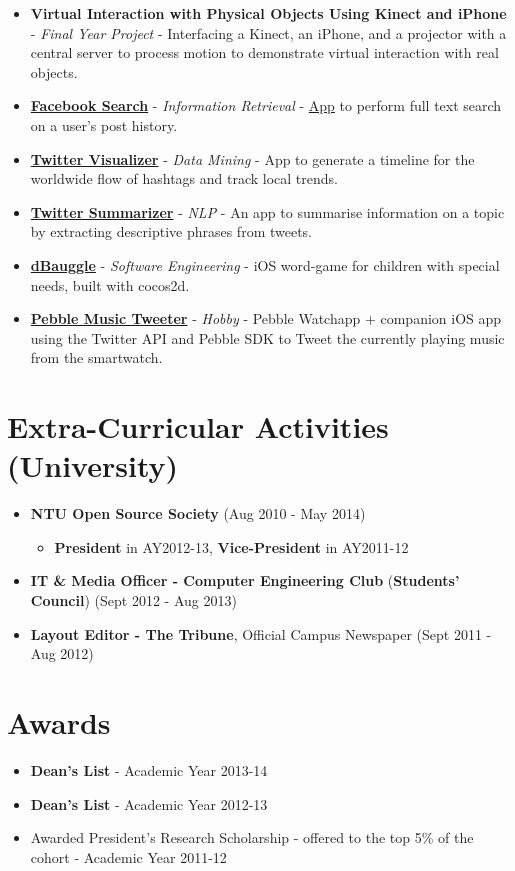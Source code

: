 \begin{itemize}
\item
  \textbf{Virtual Interaction with Physical Objects Using Kinect and
  iPhone} - \emph{Final Year Project} - Interfacing a Kinect, an iPhone,
  and a projector with a central server to process motion to demonstrate
  virtual interaction with real objects.
\item
  \href{https://github.com/arnavk/FacebookSearch}{\textbf{Facebook
  Search}} - \emph{Information Retrieval} -
  \href{http://facebook-search.herokuapp.com/}{App} to perform full text
  search on a user's post history.
\item
  \href{https://github.com/arnavk/Twitter-Visualiser}{\textbf{Twitter
  Visualizer}} - \emph{Data Mining} - App to generate a timeline for the
  worldwide flow of hashtags and track local trends.
\item
  \href{https://github.com/arnavk/NLP}{\textbf{Twitter Summarizer}} -
  \emph{NLP} - An app to summarise information on a topic by extracting
  descriptive phrases from tweets.
\item
  \href{https://itunes.apple.com/us/app/dbauggle!/id625981185?mt=8}{\textbf{dBauggle}}
  - \emph{Software Engineering} - iOS word-game for children with
  special needs, built with cocos2d.
\item
  \href{https://github.com/arnavk/Pebble-MusicTweeter}{\textbf{Pebble
  Music Tweeter}} - \emph{Hobby} - Pebble Watchapp + companion iOS app
  using the Twitter API and Pebble SDK to Tweet the currently playing
  music from the smartwatch.
\end{itemize}

\section{Extra-Curricular Activities
(University)}\label{extra-curricular-activities-university}

\begin{itemize}
\tightlist
\item
  \textbf{NTU Open Source Society} \hfill (Aug 2010 - May 2014)

  \begin{itemize}
  \tightlist
  \item
    \textbf{President} in AY2012-13, \textbf{Vice-President} in
    AY2011-12
  \end{itemize}
\item
  \textbf{IT \& Media Officer - Computer Engineering Club}
  (\textbf{Students' Council}) \hfill (Sept 2012 - Aug 2013)
\item
  \textbf{Layout Editor - The Tribune}, Official Campus Newspaper
  \hfill (Sept 2011 - Aug 2012)
\end{itemize}

\section{Awards}\label{awards}

\begin{itemize}
\tightlist
\item
  \textbf{Dean's List} - Academic Year 2013-14
\item
  \textbf{Dean's List} - Academic Year 2012-13
\item
  Awarded President's Research Scholarship - offered to the top 5\% of
  the cohort - Academic Year 2011-12
\end{itemize}
